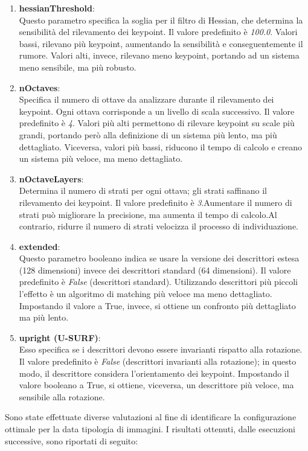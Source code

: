 \documentclass[12pt,a4paper,openright,twoside]{book}
\begin{document}
\begin{enumerate}
    \item \textbf{hessianThreshold}:\\
Questo parametro specifica la soglia per il filtro di Hessian, che determina la sensibilità del rilevamento dei keypoint. Il valore predefinito è {\itshape 100.0}. Valori bassi, rilevano più keypoint, aumentando la sensibilità e conseguentemente il rumore. Valori alti, invece, rilevano meno keypoint, portando ad un sistema meno sensibile, ma più robusto.
\item \textbf{nOctaves}:\\
Specifica il numero di ottave da analizzare durante il rilevamento dei keypoint. Ogni ottava corrisponde a un livello di scala successivo. Il valore predefinito è {\itshape 4}. Valori più alti permettono di rilevare keypoint su scale più grandi, portando però alla definizione di un sistema più lento, ma più dettagliato. Viceversa, valori più bassi, riducono il tempo di calcolo e creano un sistema più veloce, ma meno dettagliato.
\item \textbf{nOctaveLayers}:\\
Determina il numero di strati per ogni ottava; gli strati saffinano il rilevamento dei keypoint. Il valore predefinito è {\itshape 3}.Aumentare il numero di strati può migliorare la precisione, ma aumenta il tempo di calcolo.Al contrario, ridurre il numero di strati velocizza il processo di individuazione.
\item \textbf{extended}:\\
Questo parametro booleano indica se usare la versione dei descrittori estesa (128 dimensioni) invece dei descrittori standard (64 dimensioni). Il valore predefinito è {\itshape False} (descrittori standard). Utilizzando descrittori più piccoli l'effetto è un algoritmo di matching più veloce ma meno dettagliato. Impostando il valore a True, invece, si ottiene un confronto più dettagliato ma più lento.
\item \textbf{upright (U-SURF)}:\\
Esso specifica se i descrittori devono essere invarianti rispatto alla rotazione. Il valore predefinito è {\itshape False} (descrittori invarianti alla rotazione); in questo modo, il descrittore considera l'orientamento dei keypoint. Impostando il valore booleano a True, si ottiene, viceversa, un descrittore più veloce, ma sensibile alla rotazione.
\end{enumerate}
Sono state effettuate diverse valutazioni al fine di identificare la configurazione ottimale per la data tipologia di immagini. I risultati ottenuti, dalle esecuzioni successive, sono riportati di seguito:
\end{document}
